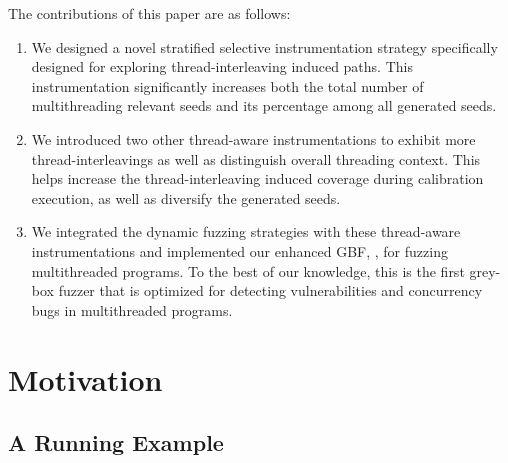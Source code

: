 The contributions of this paper are as follows:
\begin{enumerate}[1)]
\item We designed a novel stratified selective instrumentation strategy specifically designed for exploring thread-interleaving induced paths. This instrumentation significantly increases both the total number of multithreading relevant seeds and its percentage among all generated seeds.
\item We introduced two other thread-aware instrumentations to exhibit more thread-interleavings as well as distinguish overall threading context. This helps increase the thread-interleaving induced coverage during calibration execution, as well as diversify the generated seeds.
\item We integrated the dynamic fuzzing strategies with these thread-aware instrumentations and implemented our enhanced GBF, \mtfuzz, for fuzzing multithreaded programs. To the best of our knowledge, this is the first grey-box fuzzer that is optimized for detecting vulnerabilities and concurrency bugs in  multithreaded programs.
\end{enumerate}














\section{Motivation}\label{sec:motivation}

\subsection{A Running Example}\label{sec:example}



